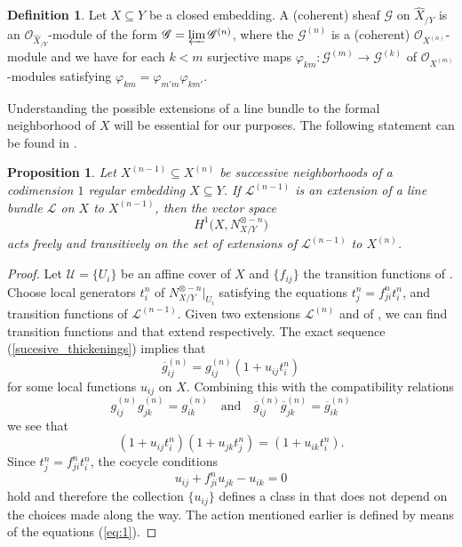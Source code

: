 \documentclass[reqno]{amsart}
\theoremstyle{plain}
\newcommand{\OO}{\mathcal{O}}
\renewcommand{\L}{\mathcal{L}}
\newcommand{\U}{\mathcal{U}}
\newcommand{\mybar}[3]{%
    \mathrlap{\hspace{#2}\overline{\scalebox{#1}[1]{\phantom{\ensuremath{#3}}}}}\ensuremath{#3}
}
\newtheorem{proposition}[theorem]{Proposition}
\theoremstyle{definition}
\newtheorem{definition}[theorem]{Definition}
\theoremstyle{named}
\begin{document}
\begin{definition}
   Let $X\subseteq Y$ be a closed embedding. A (coherent) sheaf $\mathcal G$ on $\widehat{X}_{/Y}$ is an $\OO_{\widehat{X}_{/Y}}$-module of the form $\mathcal G=\varprojlim \mathcal G^{(n)}$, where the $\mathcal G^{(n)}$ is a (coherent) $\OO_{X^{(n)}}$-module and we have for each $k<m$ surjective maps $\varphi_{km}:\mathcal G^{(m)}\to\mathcal G^{(k)}$ of $\OO_{X^{(m)}}$-modules satisfying $\varphi_{km}=\varphi_{m'm}\varphi_{km'}$.
\end{definition}

Understanding the possible extensions of a line bundle to the formal neighborhood of $X$ will be essential for our purposes.
The following statement can be found in \cite[Section I.5.a]{griffiths1966extension}.

\begin{proposition}{\label{ext_line_bundles}}
Let $X^{(n-1)}\subseteq X^{(n)}$ be successive neighborhoods of a codimension $1$ regular embedding $X\subseteq Y$. If $\L^{(n-1)}$ is an extension of a line bundle $\L$ on $X$ to $X^{(n-1)}$, then the vector space
\[
H^1\big(X,N_{X/Y}^{\otimes -n}\big)
\]
acts freely and transitively on the set of extensions of $\L^{(n-1)}$ to $X^{(n)}$.
\end{proposition}
\begin{proof}
Let $\U = \{U_i\}$ be an affine cover of $X$ and $\{f_{ij}\}$ the transition functions of . Choose local generators $t_i^n$ of $N_{X/Y}^{\otimes -n}|_{U_i}$ satisfying the equations $t_j^n = f_{ji}^{n}t_i^n$, and transition functions  of $\L^{(n-1)}$. Given two extensions $\L^{(n)}$ and \smash{$\mybar{1}{0pt}{\L}^{(n)}$} of \smash{$\L^{(n-1)}$}, we can find transition functions  and  that extend  respectively. The exact sequence (\ref{sucesive_thickenings}) implies that
\begin{equation} \label{eq:1}
\overline{g}_{ij}^{(n)} = g_{ij}^{(n)}(1+u_{ij} t_i^n)
\end{equation}
for some local functions $u_{ij}$ on $X$. Combining this with the compatibility relations
\[
g_{ij}^{(n)}g_{jk}^{(n)} = g_{ik}^{(n)}\quad\text{and}\quad \overline{g}_{ij}^{(n)}\overline{g}_{jk}^{(n)} = \overline{g}_{ik}^{(n)}
\] 
we see that
$$(1+u_{ij} t_i^n)(1+u_{jk} t_j^n)=(1+u_{ik} t_i^n).$$
Since $t_j^n=f_{ji}^nt_i^n$, the cocycle conditions
\[
u_{ij}+f_{ji}^{n}u_{jk}-u_{ik} = 0
\]
hold and therefore the collection $\{u_{ij}\}$ defines a class in  that does not depend on the choices made along the way. The action mentioned earlier is defined by means of the equations (\ref{eq:1}). 
\end{proof}
\end{document}

